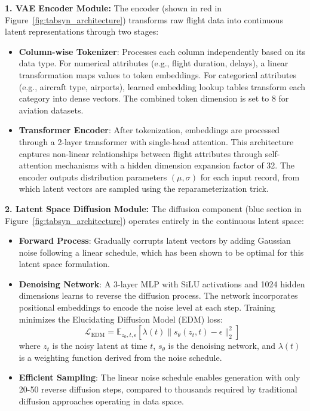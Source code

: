 \documentclass[conference]{IEEEtran}
\begin{document}
\textbf{1. VAE Encoder Module:} The encoder (shown in red in Figure~\ref{fig:tabsyn_architecture}) transforms raw flight data into continuous latent representations through two stages:
\begin{itemize}
    \item \textbf{Column-wise Tokenizer}: Processes each column independently based on its data type. For numerical attributes (e.g., flight duration, delays), a linear transformation maps values to token embeddings. For categorical attributes (e.g., aircraft type, airports), learned embedding lookup tables transform each category into dense vectors. The combined token dimension is set to 8 for aviation datasets.
    
    \item \textbf{Transformer Encoder}: After tokenization, embeddings are processed through a 2-layer transformer with single-head attention. This architecture captures non-linear relationships between flight attributes through self-attention mechanisms with a hidden dimension expansion factor of 32. The encoder outputs distribution parameters $(\mu, \sigma)$ for each input record, from which latent vectors are sampled using the reparameterization trick.
\end{itemize}

\textbf{2. Latent Space Diffusion Module:} The diffusion component (blue section in Figure~\ref{fig:tabsyn_architecture}) operates entirely in the continuous latent space:
\begin{itemize}
    \item \textbf{Forward Process}: Gradually corrupts latent vectors by adding Gaussian noise following a linear schedule, which has been shown to be optimal for this latent space formulation.
    
    \item \textbf{Denoising Network}: A 3-layer MLP with SiLU activations and 1024 hidden dimensions learns to reverse the diffusion process. The network incorporates positional embeddings to encode the noise level at each step. Training minimizes the Elucidating Diffusion Model (EDM) loss:
    \begin{equation}
    \mathcal{L}_{\text{EDM}} = \mathbb{E}_{z_0, t, \epsilon} \left[ \lambda(t) \|s_\theta(z_t, t) - \epsilon\|_2^2 \right]
    \end{equation}
    where $z_t$ is the noisy latent at time $t$, $s_\theta$ is the denoising network, and $\lambda(t)$ is a weighting function derived from the noise schedule.
    
    \item \textbf{Efficient Sampling}: The linear noise schedule enables generation with only 20-50 reverse diffusion steps, compared to thousands required by traditional diffusion approaches operating in data space.
\end{itemize}
\end{document}
